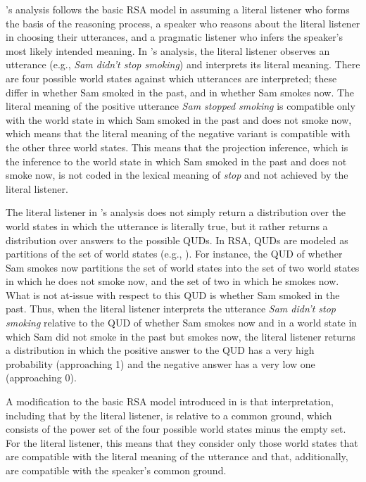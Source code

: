 \documentclass[11pt,fleqn]{article}
\newcommand{\6}{\mbox{$[\hspace*{-.6mm}[$}}
\newcommand{\9}{\mbox{$]\hspace*{-.6mm}]$}}
\newcommand{\citepos}[1]{\citeauthor{#1}'s \citeyear{#1}}
\begin{document}
\citepos{qing-etal2016} analysis follows the basic RSA model in assuming a literal listener who forms the basis of the reasoning process, a speaker who reasons about the literal listener in choosing their utterances, and a pragmatic listener who infers the speaker's most likely intended meaning.  In \citepos{qing-etal2016} analysis, the literal listener observes an utterance (e.g., {\em Sam didn't stop smoking}) and interprets its literal meaning. There are four possible world states against which utterances are interpreted; these differ in whether Sam smoked in the past, and in whether Sam smokes now. The literal meaning of the positive utterance {\em Sam stopped smoking} is compatible only with the world state in which Sam smoked in the past and does not smoke now, which means that the literal meaning of the negative variant is compatible with the other three world states. This means that the projection inference, which is the inference to the world state in which Sam smoked in the past and does not smoke now, is not coded in the lexical meaning of {\em stop} and not achieved by the literal listener.

The literal listener in \citepos{qing-etal2016} analysis does not simply return a distribution over the world states in which the utterance is literally true, but it rather returns a distribution over answers to the possible QUDs. In RSA, QUDs are modeled as partitions of the set of world states (e.g., \citealt{kao-etal2014}). For instance, the QUD of whether Sam smokes now partitions the set of world states into the set of two world states in which he does not smoke now, and the set of two in which he smokes now. What is not at-issue with respect to this QUD is whether Sam smoked in the past. Thus, when the literal listener interprets the utterance {\em Sam didn't stop smoking} relative to the QUD of whether Sam smokes now and in a world state in which Sam did not smoke in the past but smokes now, the literal listener returns a distribution in which the positive answer to the QUD has a very high probability (approaching 1) and the negative answer has a very low one (approaching 0). 

A modification to the basic RSA model introduced in \citealt{qing-etal2016} is that interpretation, including that by the literal listener, is relative to a common ground, which consists of the power set of the four possible world states minus the empty set. For the literal listener, this means that they consider only those world states that are compatible with the literal meaning of the utterance and that, additionally, are compatible with the speaker's common ground. 
\end{document}
